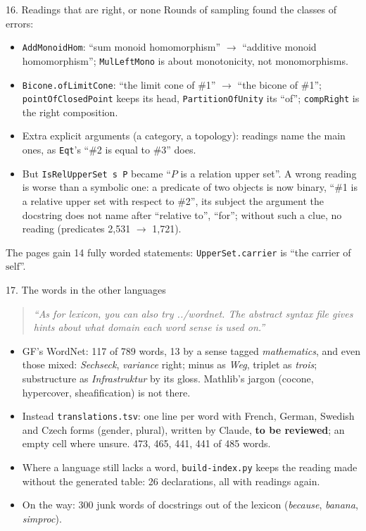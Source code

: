 \documentclass[10pt,aspectratio=169]{beamer}
\newcommand{\bad}[1]{\textcolor{warn}{#1}}
\newcommand{\ok}[1]{\textcolor{good}{#1}}
\newcommand{\prompt}[1]{\begin{quote}\small\itshape ``#1''\end{quote}}
\begin{document}
\begin{frame}{16. Readings that are right, or none}
  \footnotesize
  Rounds of sampling found the classes of errors:
  \begin{itemize}
    \item \texttt{AddMonoidHom}: \bad{``sum monoid homomorphism''} $\to$ \ok{``additive monoid
          homomorphism''}; \texttt{MulLeftMono} is about monotonicity, not monomorphisms.
    \item \texttt{Bicone.ofLimitCone}: \bad{``the limit cone of \#1''} $\to$ \ok{``the bicone
          of \#1''}; \texttt{pointOfClosedPoint} keeps its head, \texttt{PartitionOfUnity}
          its ``of''; \texttt{compRight} is the \ok{right composition}.
    \item Extra explicit arguments (a category, a topology): readings name the main ones,
          as \texttt{Eqt}'s ``\#2 is equal to \#3'' does.
    \item But \texttt{IsRelUpperSet s P} became \bad{``$P$ is a relation upper set''}. A
          wrong reading is worse than a symbolic one: a predicate of two objects is now
          binary, ``\#1 is a relative upper set with respect to \#2'', its subject the
          argument the docstring does not name after ``relative to'', ``for''; without such
          a clue, no reading (predicates 2,531 $\to$ 1,721).
  \end{itemize}
  The pages gain 14 fully worded statements: \texttt{UpperSet.carrier} is ``the carrier of
  $\mathrm{self}$''.
\end{frame}

\begin{frame}{17. The words in the other languages}
  \small
  \prompt{As for lexicon, you can also try ../wordnet. The abstract syntax file gives hints
  about what domain each word sense is used on.}
  \begin{itemize}
    \item GF's WordNet: 117 of 789 words, 13 by a sense tagged \emph{mathematics}, and
          even those mixed: \emph{Sechseck}, \emph{variance} \ok{right}; minus as
          \bad{\emph{Weg}}, triplet as \bad{\emph{trois}}; substructure as
          \bad{\emph{Infrastruktur}} by its gloss. Mathlib's jargon (cocone, hypercover,
          sheafification) is not there.
    \item Instead \texttt{translations.tsv}: one line per word with French, German,
          Swedish and Czech forms (gender, plural), written by Claude, \textbf{to be
          reviewed}; an empty cell where unsure. 473, 465, 441, 441 of 485 words.
    \item Where a language still lacks a word, \texttt{build-index.py} keeps the reading
          made without the generated table: 26 declarations, all with readings again.
    \item On the way: 300 junk words of docstrings out of the lexicon (\emph{because},
          \emph{banana}, \emph{simproc}).
  \end{itemize}
\end{frame}
\end{document}
